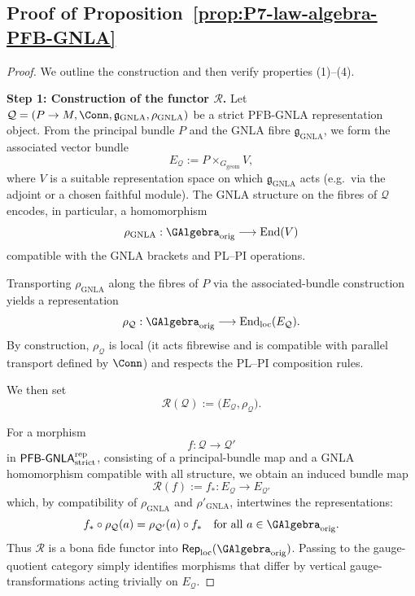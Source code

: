 \documentclass[11pt]{book}
\theoremstyle{plain}
\theoremstyle{definition}
\begin{document}
\subsection*{Proof of Proposition~\ref{prop:P7-law-algebra-PFB-GNLA}}


\begin{proof}
We outline the construction and then verify properties
\textnormal{(1)}–\textnormal{(4)}.

\medskip\noindent
\textbf{Step 1: Construction of the functor \(\mathcal{R}\).}
Let \(\mathcal{Q}=(P\to M,\Conn,\mathfrak{g}_{\mathrm{GNLA}},\rho_{\mathrm{GNLA}})\)
be a strict PFB-GNLA representation object.  From the principal bundle
 \(P\) and the GNLA fibre \(\mathfrak{g}_{\mathrm{GNLA}}\), we form the
associated vector bundle
\[
  E_{\mathcal{Q}}
  := P\times_{G_{\mathrm{geom}}} V,
\]
where \(V\) is a suitable representation space on which
\(\mathfrak{g}_{\mathrm{GNLA}}\) acts (e.g.\ via the adjoint or a
chosen faithful module).  The GNLA structure on the fibres of
\(\mathcal{Q}\) encodes, in particular, a homomorphism
\[
  \rho_{\mathrm{GNLA}} :
  \GAlgebra_{\mathrm{orig}} \longrightarrow \mathrm{End}(V)
\]
compatible with the GNLA brackets and PL--PI operations.

Transporting \(\rho_{\mathrm{GNLA}}\) along the fibres of \(P\) via the
associated-bundle construction yields a representation
\[
  \rho_{\mathcal{Q}} :
  \GAlgebra_{\mathrm{orig}} \longrightarrow
  \mathrm{End}_{\mathrm{loc}}(E_{\mathcal{Q}}).
\]
By construction, \(\rho_{\mathcal{Q}}\) is local (it acts fibrewise and
is compatible with parallel transport defined by \(\Conn\)) and
respects the PL--PI composition rules.

We then set
\[
  \mathcal{R}(\mathcal{Q})
  :=
  \bigl(E_{\mathcal{Q}},\rho_{\mathcal{Q}}\bigr).
\]

For a morphism
\[
  f:\mathcal{Q}\longrightarrow\mathcal{Q}'
\]
in \(\mathsf{PFB\text- GNLA}^{\mathrm{rep}}_{\mathrm{strict}}\),
consisting of a principal-bundle map and a GNLA homomorphism
compatible with all structure, we obtain an induced bundle map
\[
  \mathcal{R}(f)
  :=
  f_* : E_{\mathcal{Q}}\longrightarrow E_{\mathcal{Q}'}
\]
which, by compatibility of \(\rho_{\mathrm{GNLA}}\) and
\(\rho'_{\mathrm{GNLA}}\), intertwines the representations:
\[
  f_*\circ\rho_{\mathcal{Q}}(a)
  =
  \rho_{\mathcal{Q}'}(a)\circ f_*
  \quad\text{for all } a\in\GAlgebra_{\mathrm{orig}}.
\]
Thus \(\mathcal{R}\) is a bona fide functor into
\(\mathsf{Rep}_{\mathrm{loc}}(\GAlgebra_{\mathrm{orig}})\).  Passing
to the gauge-quotient category simply identifies morphisms that differ
by vertical gauge-transformations acting trivially on \(E_{\mathcal{Q}}\).


\end{proof}
\end{document}
